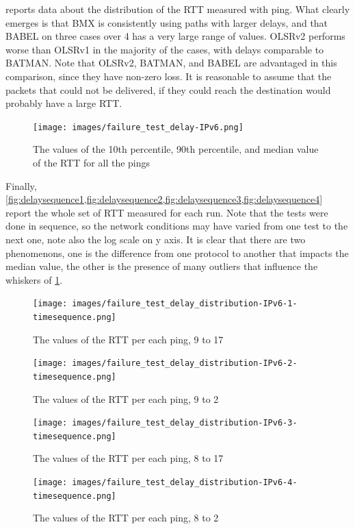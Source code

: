 \documentclass[10pt,onecolumn]{paper}
\begin{document}
 reports data about the distribution of the RTT measured
with ping. What clearly emerges is that BMX is consistently using paths with
larger delays, and that BABEL on three cases over 4 has a very large range of
values. OLSRv2 performs worse than OLSRv1 in the majority of the cases, with
delays comparable to BATMAN. Note that OLSRv2, BATMAN, and BABEL are advantaged
in this comparison, since they have non-zero loss. It is reasonable to assume
that the packets that could not be delivered, if they could reach the
destination would probably have a large RTT.

\begin{figure}[!htb]
  \centering
  \texttt{[image: images/failure\_test\_delay-IPv6.png]}
  \caption{The values of the 10th percentile, 90th percentile, and median value
    of the RTT for all the pings}
  \label{fig:delaydist}
\end{figure}


Finally,
\cref{fig:delaysequence1,fig:delaysequence2,fig:delaysequence3,fig:delaysequence4}
report the whole set of RTT measured for each run. Note that the tests were done
in sequence, so the network conditions may have varied from one test to the next
one, note also the log scale on y axis. It is clear that there are two
phenomenons, one is the difference from one protocol to another that impacts the
median value, the other is the presence of many outliers that influence the
whiskers of \cref{fig:delaydist}.

\begin{figure}[!htb]
  \centering
  \texttt{[image: images/failure\_test\_delay\_distribution-IPv6-1-timesequence.png]}
    \caption{The values of the RTT per each ping, 9 to 17}
  \label{fig:delaysequence1}
\end{figure}

\begin{figure}[!htb]
  \centering
  \texttt{[image: images/failure\_test\_delay\_distribution-IPv6-2-timesequence.png]}
    \caption{The values of the RTT per each ping, 9 to 2}
  \label{fig:delaysequence2}
\end{figure}

\begin{figure}[!htb]
  \centering
  \texttt{[image: images/failure\_test\_delay\_distribution-IPv6-3-timesequence.png]}
    \caption{The values of the RTT per each ping, 8 to 17}
  \label{fig:delaysequence3}
\end{figure}

\begin{figure}[!htb]
  \centering
  \texttt{[image: images/failure\_test\_delay\_distribution-IPv6-4-timesequence.png]}
    \caption{The values of the RTT per each ping, 8 to 2}
  \label{fig:delaysequence4}
\end{figure}
\end{document}
